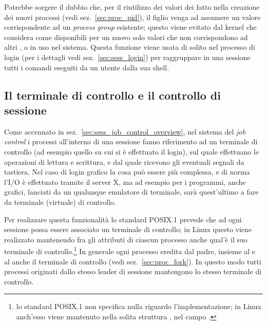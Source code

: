 Potrebbe sorgere il dubbio che, per il riutilizzo dei valori dei 
fatto nella creazione dei nuovi processi (vedi sez.~\ref{sec:proc_pid}), il
figlio venga ad assumere un valore corrispondente ad un \textit{process group}
esistente; questo viene evitato dal kernel che considera come disponibili per
un nuovo  solo valori che non corrispondono ad altri ,
 o  in uso nel sistema. Questa funzione viene usata di
solito nel processo di login (per i dettagli vedi sez.~\ref{sec:sess_login})
per raggruppare in una sessione tutti i comandi eseguiti da un utente dalla
sua shell.


\subsection{Il terminale di controllo e il controllo di sessione}
\label{sec:sess_ctrl_term}

Come accennato in sez.~\ref{sec:sess_job_control_overview}, nel sistema del
\textit{job control} i processi all'interno di una sessione fanno riferimento
ad un terminale di controllo (ad esempio quello su cui si è effettuato il
login), sul quale effettuano le operazioni di lettura e scrittura, e dal quale
ricevono gli eventuali segnali da tastiera. Nel caso di login grafico la cosa
può essere più complessa, e di norma l'I/O è effettuato tramite il server X,
ma ad esempio per i programmi, anche grafici, lanciati da un qualunque
emulatore di terminale, sarà quest'ultimo a fare da terminale (virtuale) di
controllo.

Per realizzare questa funzionalità lo standard POSIX.1 prevede che ad ogni
sessione possa essere associato un terminale di controllo; in Linux questo
viene realizzato mantenendo fra gli attributi di ciascun processo anche qual'è
il suo terminale di controllo.\footnote{lo standard POSIX.1 non specifica
  nulla riguardo l'implementazione; in Linux anch'esso viene mantenuto nella
  solita struttura , nel campo .}  In generale
ogni processo eredita dal padre, insieme al  e al  anche il
terminale di controllo (vedi sez.~\ref{sec:proc_fork}). In questo modo tutti
processi originati dallo stesso leader di sessione mantengono lo stesso
terminale di controllo.

